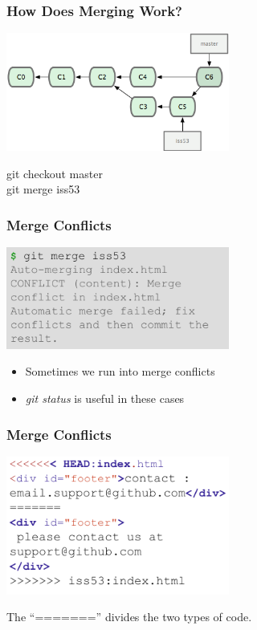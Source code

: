 \begin{frame}
\frametitle{\large How Does Merging Work?}
\begin{center}
\includegraphics[width=0.55\textwidth]{img/branching_images/f8.png}
\end{center}
\vspace{2mm}
\begin{center}
git checkout master \\
git merge iss53
\end{center}
\end{frame}
\note{}

\begin{frame}
\frametitle{\large Merge Conflicts}
\begin{center}
\includegraphics[width=0.55\textwidth]{img/branching_images/merge1.png}
\end{center}
\vspace{2mm}
\begin{itemize}
\item Sometimes we run into merge conflicts
\item \emph{git status} is useful in these cases
\end{itemize}
\end{frame}
\note{}

\begin{frame}
\frametitle{\large Merge Conflicts}
\begin{center}
\includegraphics[width=0.55\textwidth]{img/branching_images/merge2.png}
\end{center}
\vspace{2mm}
\begin{center}
The ``======='' divides the two types of code.
\end{center}
\end{frame}
\note{}
